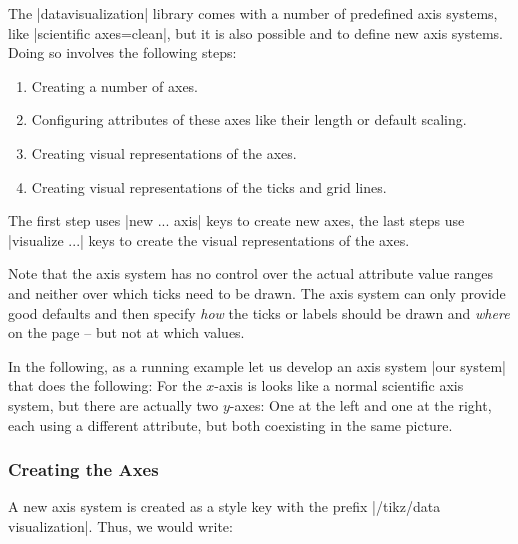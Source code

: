 The |datavisualization| library comes with a number of predefined axis systems,
like |scientific axes=clean|, but it is also possible and to define new axis
systems. Doing so involves the following steps:
%
\begin{enumerate}
    \item Creating a number of axes.
    \item Configuring attributes of these axes like their length or default
        scaling.
    \item Creating visual representations of the axes.
    \item Creating visual representations of the ticks and grid lines.
\end{enumerate}

The first step uses |new ... axis| keys to create new axes, the last steps use
|visualize ...| keys to create the visual representations of the axes.

Note that the axis system has no control over the actual attribute value ranges
and neither over which ticks need to be drawn. The axis system can only provide
good defaults and then specify \emph{how} the ticks or labels should be drawn
and \emph{where} on the page -- but not at which values.

In the following, as a running example let us develop an axis system
|our system| that does the following: For the $x$-axis is looks like a normal
scientific axis system, but there are actually two $y$-axes: One at the left
and one at the right, each using a different attribute, but both coexisting in
the same picture.


\subsubsection{Creating the Axes}

A new axis system is created as a style key with the prefix
|/tikz/data visualization|. Thus, we would write:
%
\begin{codeexample}
\end{codeexample}

